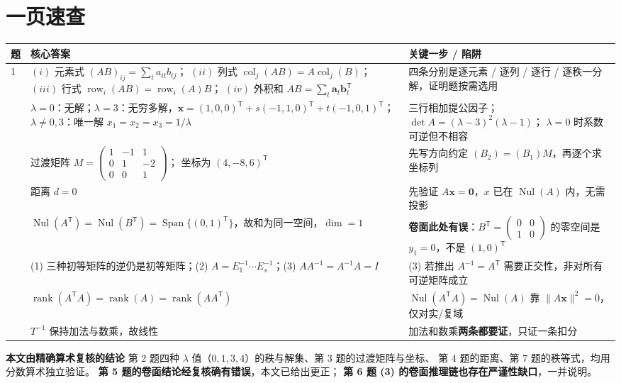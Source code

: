 \documentclass[10pt]{ctexart}
\newcommand{\rank}{\operatorname{rank}}
\newcommand{\Nul}{\operatorname{Nul}}
\newcommand{\Span}{\operatorname{Span}}
\newcommand{\TT}{^{\mathsf T}}
\newcommand{\bv}[1]{\begin{pmatrix}#1\end{pmatrix}}
\begin{document}
\section*{一页速查}

\begin{center}
\small
\begin{tabular}{@{}p{1.0cm}p{5.2cm}p{7.2cm}@{}}
\toprule
题 & 核心答案 & 关键一步 / 陷阱\\
\midrule
1 & $(i)$ 元素式 $(AB)_{ij}=\sum_t a_{it}b_{tj}$；
$(ii)$ 列式 $\operatorname{col}_j(AB)=A\operatorname{col}_j(B)$；
$(iii)$ 行式 $\operatorname{row}_i(AB)=\operatorname{row}_i(A)B$；
$(iv)$ 外积和 $AB=\sum_t\mathbf a_t\mathbf b_t\TT$
& 四条分别是逐元素 / 逐列 / 逐行 / 逐秩一分解，证明题按需选用\\
\addlinespace
2 & $\lambda=0$：无解；$\lambda=3$：无穷多解，$\mathbf x=(1,0,0)\TT+s(-1,1,0)\TT+t(-1,0,1)\TT$；
$\lambda\neq0,3$：唯一解 $x_1=x_2=x_3=1/\lambda$
& 三行相加提公因子；$\det A=(\lambda-3)^2(\lambda-1)$；
$\lambda=0$ 时系数可逆但不相容\\
\addlinespace
3 & 过渡矩阵 $M=\bv{1&-1&1\\0&1&-2\\0&0&1}$；
坐标为 $(4,-8,6)\TT$
& 先写方向约定 $(B_2)=(B_1)M$，再逐个求坐标列\\
\addlinespace
4 & 距离 $d=0$
& 先验证 $A\mathbf x=\mathbf 0$，$x$ 已在 $\Nul(A)$ 内，无需投影\\
\addlinespace
5 & $\Nul(A\TT)=\Nul(B\TT)=\Span\{(0,1)\TT\}$，故和为同一空间，$\dim=1$
& \textbf{卷面此处有误}：$B\TT=\bv{0&0\\1&0}$ 的零空间是 $y_1=0$，不是 $(1,0)\TT$\\
\addlinespace
6 & (1) 三种初等矩阵的逆仍是初等矩阵；(2) $A=E_1^{-1}\cdots E_s^{-1}$；(3) $AA^{-1}=A^{-1}A=I$
& (3) 若推出 $A^{-1}=A\TT$ 需要正交性，非对所有可逆矩阵成立\\
\addlinespace
7 & $\rank(A\TT A)=\rank(A)=\rank(AA\TT)$
& $\Nul(A\TT A)=\Nul(A)$ 靠 $\lVert A\mathbf x\rVert^2=0$，仅对实/复域\\
\addlinespace
8 & $T^{-1}$ 保持加法与数乘，故线性
& 加法和数乘\textbf{两条都要证}，只证一条扣分\\
\bottomrule
\end{tabular}
\end{center}

\vspace{0.3cm}
\begin{keybox}
\textbf{本文由精确算术复核的结论}\quad
第 2 题四种 $\lambda$ 值（$0,1,3,4$）的秩与解集、第 3 题的过渡矩阵与坐标、
第 4 题的距离、第 7 题的秩等式，均用分数算术独立验证。
\textbf{第 5 题的卷面结论经复核确有错误}，本文已给出更正；
\textbf{第 6 题 (3) 的卷面推理链也存在严谨性缺口}，一并说明。
\end{keybox}
\end{document}
